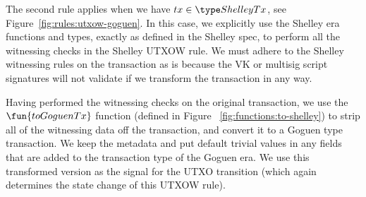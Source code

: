 The second rule applies when we have $tx \in \ShelleyTx$, see
Figure~\ref{fig:rules:utxow-goguen}. In this case, we explicitly use the Shelley
era functions and types, exactly as defined in the Shelley spec, to perform all the
witnessing checks in the Shelley UTXOW rule. We must adhere to the Shelley
witnessing rules on the transaction as is because the VK or multisig
script signatures will not validate if we transform the transaction in any way.

Having performed the witnessing checks on the original transaction, we use
the $\fun{toGoguenTx}$ function (defined in Figure
~\ref{fig:functions:to-shelley}) to strip all of the witnessing data off the
transaction, and convert it to a Goguen type transaction. We keep the metadata and
put default trivial values in any fields that are added to the transaction type
of the Goguen era. We use this transformed version as the signal for the
UTXO transition (which again determines the state change of this UTXOW rule).

